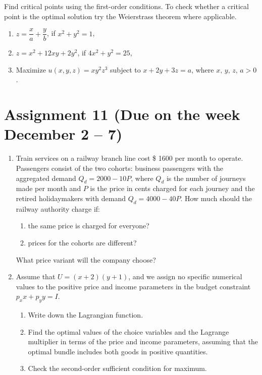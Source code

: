 \documentclass[12pt]{article} %
\theoremstyle{definition} %
\begin{document}
Find critical points using the first-order conditions. To check whether a critical point is the optimal solution try the Weierstrass theorem where applicable.

\begin{enumerate}[resume]
\item $z=\dfrac xa+\dfrac yb$, if $x^2+y^2=1$,
\item $z=x^2+12xy+2y^2$, if $4x^2+y^2=25$,
\item Maximize $u(x,y,z)=xy^2z^3$ subject to $x+2y+3z=a$, where $x,\,y,\,z,\,a>0$.
\end{enumerate}




\section*{Assignment 11 (Due on the week December 2 – 7)}

\begin{enumerate}
\item Train	services on a railway branch line cost \$ 1600 per month to operate. Passengers consist of the two cohorts: business passengers with the aggregated demand $Q_d=2000-10P$, where $Q_d$ is the number of journeys made per month and $P$ is the price in cents charged for each journey and the retired holidaymakers with demand $Q_d=4000-40P$. How much should	the railway authority charge if:
    \begin{enumerate}
    \item the same price is charged for everyone?
    \item prices for the cohorts are different?
    \end{enumerate}
What price variant will the company choose?
\item Assume that $U=(x+2)(y+1)$, and we assign no specific numerical values to the positive price and income parameters in the budget constraint $p_xx+p_yy=I$.
    \begin{enumerate}
    \item Write down the Lagrangian function.
    \item Find the optimal values of the choice variables and the Lagrange multiplier in terms of the price and income parameters, assuming that the optimal bundle includes both goods in positive quantities.
    \item Check the second-order sufficient condition for maximum.
    \end{enumerate}
\end{enumerate}
\end{document}
